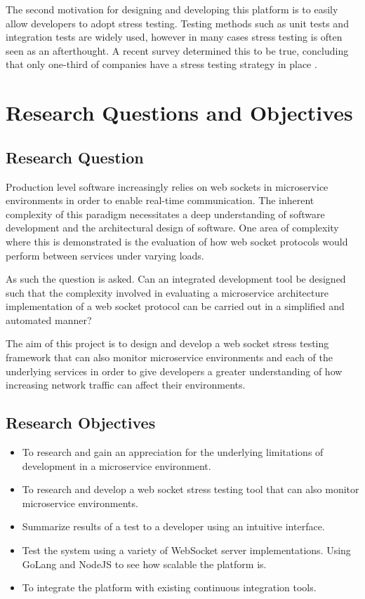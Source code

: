 The second motivation for designing and developing this platform is to easily allow developers to adopt stress testing. Testing methods such as unit tests and integration tests are widely used, however in many cases stress testing is often seen as an afterthought. A recent survey determined this to be true, concluding that only one-third of companies have a stress testing strategy in place \cite{bezemer2019performance}.

\section{Research Questions and Objectives}

\subsection{Research Question}

Production level software increasingly relies on web sockets in microservice environments in order to enable real-time communication. The inherent complexity of this paradigm necessitates a deep understanding of software development and the architectural design of software. One area of complexity where this is demonstrated is the evaluation of how web socket protocols would perform between services under varying loads. 

As such the question is asked. Can an integrated development tool be designed such that the complexity involved in evaluating a microservice architecture implementation of a web socket protocol can be carried out in a simplified and automated manner?

The aim of this project is to design and develop a web socket stress testing framework that can also monitor microservice environments and each of the underlying services in order to give developers a greater understanding of how increasing network traffic can affect their environments.

\subsection{Research Objectives}

\begin{itemize}
  \item To research and gain an appreciation for the underlying limitations of development in a microservice environment.
  \item To research and develop a web socket stress testing tool that can also monitor microservice environments.
  \item Summarize results of a test to a developer using an intuitive interface.
  \item Test the system using a variety of WebSocket server implementations. Using GoLang and NodeJS to see how scalable the platform is.
  \item To integrate the platform with existing continuous integration tools.
\end{itemize}

